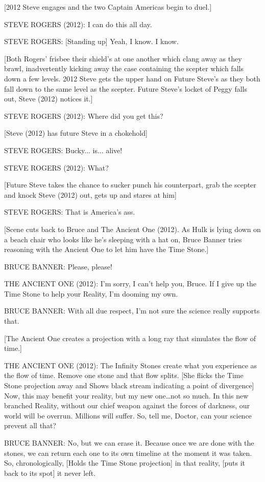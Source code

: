 [2012 Steve engages and the two Captain Americas begin to duel.]

STEVE ROGERS (2012): I can do this all day.

STEVE ROGERS: [Standing up] Yeah, I know. I know.

[Both Rogers' frisbee their shield's at one another which clang away as they brawl, inadvertently kicking away the case containing the scepter which falls down a few levels. 2012 Steve gets the upper hand on Future Steve's as they both fall down to the same level as the scepter. Future Steve's locket of Peggy falls out, Steve (2012) notices it.]

STEVE ROGERS (2012): Where did you get this?

[Steve (2012) has future Steve in a chokehold]

STEVE ROGERS: Bucky... is... alive!

STEVE ROGERS (2012): What?

[Future Steve takes the chance to sucker punch his counterpart, grab the scepter and knock Steve (2012) out, gets up and stares at him]

STEVE ROGERS: That is America's ass.

[Scene cuts back to Bruce and The Ancient One (2012). As Hulk is lying down on a beach chair who looks like he's sleeping with a hat on, Bruce Banner tries reasoning with the Ancient One to let him have the Time Stone.]

BRUCE BANNER: Please, please!

THE ANCIENT ONE (2012): I'm sorry, I can't help you, Bruce. If I give up the Time Stone to help your Reality, I'm dooming my own.

BRUCE BANNER: With all due respect, I'm not sure the science really supports that.

[The Ancient One creates a projection with a long ray that simulates the flow of time.]

THE ANCIENT ONE (2012): The Infinity Stones create what you experience as the flow of time. Remove one stone and that flow splits. [She flicks the Time Stone projection away and Shows black stream indicating a point of divergence] Now, this may benefit your reality, but my new one…not so much. In this new branched Reality, without our chief weapon against the forces of darkness, our world will be overrun. Millions will suffer. So, tell me, Doctor, can your science prevent all that?

BRUCE BANNER: No, but we can erase it. Because once we are done with the stones, we can return each one to its own timeline at the moment it was taken. So, chronologically, [Holds the Time Stone projection] in that reality, [puts it back to its spot] it never left.

